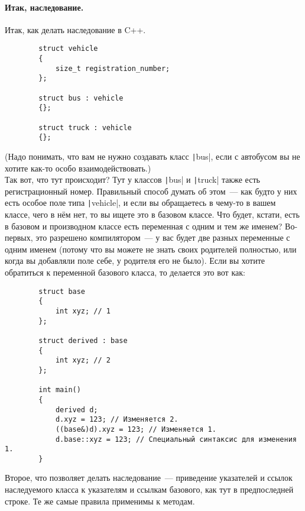 \documentclass{article}
\begin{document}
    \paragraph{Итак, наследование.}
    Итак, как делать наследование в C++.
    \begin{verbatim}
        struct vehicle
        {
            size_t registration_number;
        };

        struct bus : vehicle
        {};

        struct truck : vehicle
        {};
    \end{verbatim}
    (Надо понимать, что вам не нужно создавать класс \texttt|bus|, если с автобусом вы не хотите как-то особо взаимодействовать.)\\
    Так вот, что тут происходит? Тут у классов \texttt|bus| и \texttt|truck| также есть регистрационный номер. Правильный способ думать об этом~--- как будто у них есть особое поле типа \texttt|vehicle|, и если вы обращаетесь в чему-то в вашем классе, чего в нём нет, то вы ищете это в базовом классе. Что будет, кстати, есть в базовом и производном классе есть переменная с одним и тем же именем? Во-первых, это разрешено компилятором~--- у вас будет две разных переменные с одним именем (потому что вы можете не знать своих родителей полностью, или когда вы добавляли поле себе, у родителя его не было). Если вы хотите обратиться к переменной базового класса, то делается это вот как:
    \begin{verbatim}
        struct base
        {
            int xyz; // 1
        };

        struct derived : base
        {
            int xyz; // 2
        };

        int main()
        {
            derived d;
            d.xyz = 123; // Изменяется 2.
            ((base&)d).xyz = 123; // Изменяется 1.
            d.base::xyz = 123; // Специальный синтаксис для изменения 1.
        }
    \end{verbatim}
    Второе, что позволяет делать наследование~--- приведение указателей и ссылок наследуемого класса к указателям и ссылкам базового, как тут в предпоследней строке. Те же самые правила применимы к методам.
\end{document}
